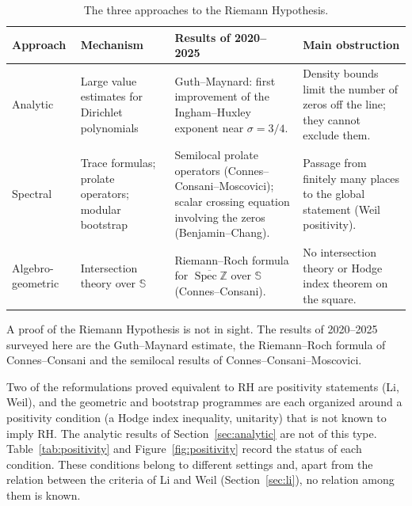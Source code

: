 \documentclass[11pt]{amsart}
\theoremstyle{definition}
\theoremstyle{remark}
\begin{document}
\begin{table}[ht]
    \centering
    \caption{The three approaches to the Riemann Hypothesis.}\label{tab:status}
    \vspace{0.2cm}
    \begin{tabular}{@{}L{2.3cm}L{3cm}L{4.6cm}L{4.6cm}@{}}
        \toprule
        Approach & Mechanism & Results of 2020--2025 & Main obstruction \\
        \midrule
        Analytic & Large value estimates for Dirichlet polynomials & Guth--Maynard: first improvement of the Ingham--Huxley exponent near $\sigma = 3/4$. & Density bounds limit the number of zeros off the line; they cannot exclude them. \\
        \midrule
        Spectral & Trace formulas; prolate operators; modular bootstrap & Semilocal prolate operators (Connes--Consani--Moscovici); scalar crossing equation involving the zeros (Benjamin--Chang). & Passage from finitely many places to the global statement (Weil positivity). \\
        \midrule
        Algebro-geometric & Intersection theory over $\mathbb{S}$ & Riemann--Roch formula for $\overline{\operatorname{Spec}\mathbb{Z}}$ over $\mathbb{S}$ (Connes--Consani). & No intersection theory or Hodge index theorem on the square. \\
        \bottomrule
    \end{tabular}
\end{table}

A proof of the Riemann Hypothesis is not in sight. The results of 2020--2025 surveyed here are the Guth--Maynard estimate, the Riemann--Roch formula of Connes--Consani and the semilocal results of Connes--Consani--Moscovici.

Two of the reformulations proved equivalent to RH are positivity statements (Li, Weil), and the geometric and bootstrap programmes are each organized around a positivity condition (a Hodge index inequality, unitarity) that is not known to imply RH. The analytic results of Section~\ref{sec:analytic} are not of this type. Table~\ref{tab:positivity} and Figure~\ref{fig:positivity} record the status of each condition. These conditions belong to different settings and, apart from the relation between the criteria of Li and Weil (Section~\ref{sec:li}), no relation among them is known.
\end{document}
